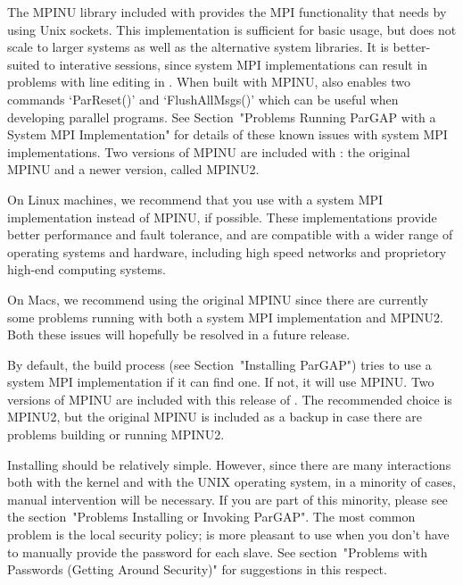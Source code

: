 The MPINU library included with {\ParGAP} provides the MPI functionality that
{\ParGAP} needs by using Unix sockets. This implementation is sufficient for
basic {\ParGAP} usage, but does not scale to larger systems as well as the 
alternative system libraries. It is better-suited to interative {\ParGAP} 
sessions, since system MPI implementations can result in problems with line 
editing in {\ParGAP}. When built with MPINU, {\ParGAP} also enables two 
commands `ParReset()' and `FlushAllMsgs()' which can be useful when developing 
parallel programs. See 
Section~"Problems Running ParGAP with a System MPI Implementation" for details
of these known issues with system MPI implementations. Two versions of MPINU
are included with {\ParGAP}: the original MPINU and a newer version, called 
MPINU2. 

On Linux machines, we recommend that you use {\ParGAP} with a system MPI 
implementation instead of MPINU, if possible. These implementations provide 
better performance and fault tolerance, and are compatible with a wider range 
of operating systems and hardware, including high speed networks and 
proprietory high-end computing systems. 

On Macs, we recommend using the original MPINU since there are currently some 
problems running {\ParGAP} with both a system MPI implementation and MPINU2.
Both these issues will hopefully be resolved in a future release.

By default, the {\ParGAP} build process 
(see Section~"Installing ParGAP") tries to use a system MPI implementation if 
it can find one. If not, it will use MPINU. Two versions of MPINU are included 
with this release of {\ParGAP}. The recommended choice is MPINU2, but the 
original MPINU is included as a backup in case there are problems building or 
running MPINU2.



Installing {\ParGAP} should be relatively simple.  However,  since  there
are many interactions both with the  {\GAP}  kernel  and  with  the  UNIX
operating system, in a minority of cases,  manual  intervention  will  be
necessary. If you are part of  this minority,  please  see  the  
section~"Problems Installing or Invoking ParGAP". The most common problem 
is the local security policy; {\ParGAP} is more pleasant to use when  you  
don't have  to  manually  provide the password for  each  slave.  See  
section~"Problems  with Passwords (Getting Around Security)" for  
suggestions  in this respect.


